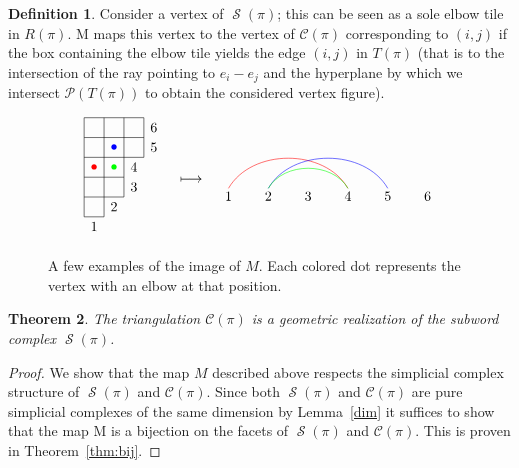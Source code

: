 \documentclass[10pt]{amsart}
\newtheorem{theo}{Theorem}[section]
\theoremstyle{definition}
\newtheorem{defi}[theo]{Definition}
\numberwithin{equation}{section}
\newcommand*\C{{\mathcal{C}}}
\renewcommand*\P{{\mathcal{P}}}
\newcommand{\lmp}[1]{\mathrel{\mathop{\longmapsto}^{#1}}}
\newcommand*\+{\smash{\lower2pt\hbox{\rlap{\vrule height14pt}}\raise2pt\hbox{\rlap{\hskip-3pt \vrule height.4pt depth0pt width14.7pt}}}}
\DeclareMathOperator{\Scal}{\mathcal{S}}
\begin{document}
\begin{defi}
Consider a vertex of $\Scal(\pi)$; this can be seen as a sole elbow tile in $R(\pi)$. M maps this vertex to the vertex of $\C(\pi)$ corresponding to $(i,j)$ if the box containing the elbow tile yields the edge $(i,j)$ in $T(\pi)$ (that is to the intersection of the ray pointing to $e_i-e_j$ and the hyperplane by which we intersect $\P(T(\pi))$ to obtain the considered vertex figure).
\end{defi}


\begin{figure}[h]
\[
\begin{aligned}
\begin{tikzpicture}
\draw (0,1.5)--(1.5,1.5)--(1.5,2.5)--(0.5,2.5)--(0.5,0)--(0,0)--(0,2)--(1.5,2);
\draw (0,0.5)--(1,0.5)--(1,2.5);
\draw (0,1)--(1,1);
\draw (0,2)--(0,2.5)--(0.5,2.5);
\draw (0.25,1.25) node {\color{red}$\bullet$};
\draw (0.75,1.75) node {\color{blue}$\bullet$};
\draw (0.75,1.25) node {\color{green}$\bullet$};
\draw (0.25,-0.25) node {1};
\draw (0.75,0.25) node {2};
\draw (1.25,0.75) node {3};
\draw (1.25,1.25) node {4};
\draw (1.75,1.75) node {5};
\draw (1.75,2.25) node {6};
\end{tikzpicture}
\end{aligned}
\quad \lmp{} \quad
\begin{aligned}
\begin{tikzpicture}
\path[color=red] (1,0) edge [bend left=60] (4,0);
\path[color=blue] (2,0) edge [bend left=60] (5,0);
\path[color=green] (2,0) edge [bend left=60] (4,0);
\draw[] (1,-0.2) node {1};
\draw[] (2,-0.2) node {2};
\draw[] (3,-0.2) node {3};
\draw[] (4,-0.2) node {4};
\draw[] (5,-0.2) node {5};
\draw[] (6,-0.2) node {6};
\end{tikzpicture}
\end{aligned}
\]
\caption{A few examples of the image of $M$. Each colored dot represents the vertex with an elbow at that position.}\label{distbis}
\end{figure}

\begin{theo}\label{geom}
The triangulation $\C(\pi)$ is a geometric realization of the subword complex $\Scal(\pi)$. 
\end{theo}

\begin{proof}
We show that the map $M$ described above respects the simplicial complex structure of $\Scal(\pi)$ and $\C(\pi)$. Since both $\Scal(\pi)$ and $\C(\pi)$ are pure simplicial complexes of the same dimension by Lemma~\ref{dim} it suffices to show that the map M is a bijection on the facets of $\Scal(\pi)$ and $\C(\pi)$. This is proven in Theorem~\ref{thm:bij}.
\end{proof}
\end{document}
